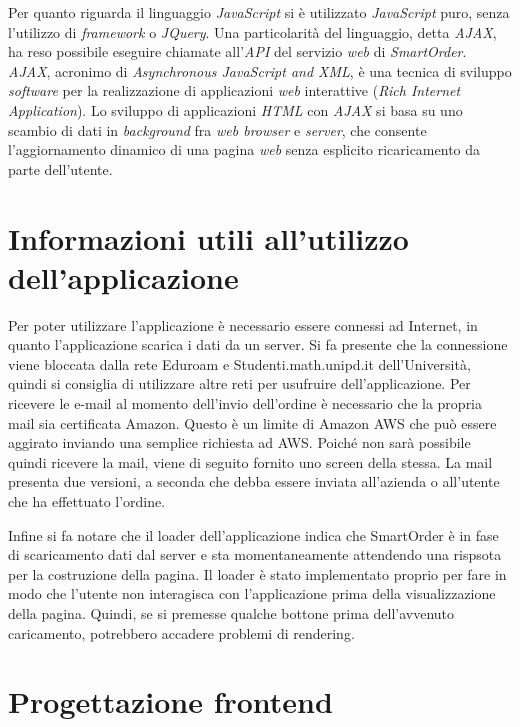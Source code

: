 \documentclass[12pt, a4paper, titlepage]{report}
\begin{document}
	Per quanto riguarda il linguaggio \textit{JavaScript} si è utilizzato \textit{JavaScript} puro, senza l'utilizzo di \textit{framework} o \textit{JQuery}. Una particolarità del linguaggio, detta \textit{AJAX}, ha reso possibile eseguire chiamate all'\textit{API} del servizio \textit{web} di \textit{SmartOrder}. \textit{AJAX}, acronimo di \textit{\textit{Asynchronous JavaScript and XML}}, è una tecnica di sviluppo \textit{software} per la realizzazione di applicazioni \textit{web} interattive (\textit{Rich Internet Application}). Lo sviluppo di applicazioni \textit{HTML} con \textit{AJAX} si basa su uno scambio di dati in \textit{background} fra \textit{web browser} e \textit{server}, che consente l'aggiornamento dinamico di una pagina \textit{web} senza esplicito ricaricamento da parte dell'utente.
	
	\section{Informazioni utili all'utilizzo dell'applicazione}
	
	Per poter utilizzare l'applicazione è necessario essere connessi ad Internet, in quanto l'applicazione scarica i dati da un server. Si fa presente che la connessione viene bloccata dalla rete Eduroam e Studenti.math.unipd.it dell'Università, quindi si consiglia di utilizzare altre reti per usufruire dell'applicazione. Per ricevere le e-mail al momento dell'invio dell'ordine è necessario che la propria mail sia certificata Amazon. Questo è un limite di Amazon AWS che può essere aggirato inviando una semplice richiesta ad AWS. Poiché non sarà possibile quindi ricevere la mail, viene di seguito fornito uno screen della stessa. La mail presenta due versioni, a seconda che debba essere inviata all'azienda o all'utente che ha effettuato l'ordine.
	
	Infine si fa notare che il loader dell'applicazione indica che SmartOrder è in fase di scaricamento dati dal server e sta momentaneamente attendendo una rispsota per la costruzione della pagina. Il loader è stato implementato proprio per fare in modo che l'utente non interagisca con l'applicazione prima della visualizzazione della pagina. Quindi, se si premesse qualche bottone prima dell'avvenuto caricamento, potrebbero accadere problemi di rendering.
	
	\section{Progettazione frontend}
	
\end{document}
